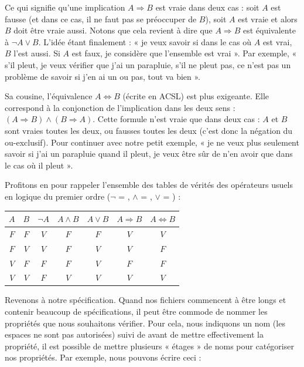 Ce qui signifie qu'une implication $A \Rightarrow B$ est vraie dans deux cas :
soit $A$ est fausse (et dans ce cas, il ne faut pas se préoccuper de $B$), soit
$A$ est vraie et alors $B$ doit être vraie aussi. Notons que cela revient à dire que
$A \Rightarrow B$ est équivalente à $\neg A \vee B$. L'idée étant finalement :
« je veux savoir si dans le cas où $A$ est vrai, $B$ l'est aussi. Si $A$ est
faux, je considère que l'ensemble est vrai ». Par exemple, « s'il pleut, je veux
vérifier que j'ai un parapluie, s'il ne pleut pas, ce n'est pas un problème
de savoir si j'en ai un ou pas, tout va bien ».



Sa cousine, l'équivalence $A \Leftrightarrow B$ (écrite  en ACSL)
est plus exigeante. Elle correspond à la conjonction de l'implication dans les deux sens :
$(A \Rightarrow B) \wedge (B \Rightarrow A)$. Cette formule n'est vraie que
dans deux cas : $A$ et $B$ sont vraies toutes les deux, ou fausses
toutes les deux (c'est donc la négation du ou-exclusif). Pour continuer avec
notre petit exemple, « je ne veux plus seulement savoir si j'ai un parapluie
quand il pleut, je veux être sûr de n'en avoir que dans le cas où il pleut ».



\begin{Information}
Profitons en pour rappeler l'ensemble des tables de vérités des opérateurs
usuels en logique du premier ordre ($\neg$ = \CodeInline{!}, $\wedge$ = \CodeInline{\&\&},
$\vee$ = \CodeInline{||}) :

\begin{longtabu}{|c|c|c|c|c|c|c|} \hline
$A$ & $B$ & $\neg A$ & $A \wedge B$ & $A \vee B$ & $A \Rightarrow B$ & $A \Leftrightarrow B$ \\ \hline
$F$ & $F$ & $V$ & $F$ & $F$ & $V$ & $V$ \\ \hline
$F$ & $V$ & $V$ & $F$ & $V$ & $V$ & $F$ \\ \hline
$V$ & $F$ & $F$ & $F$ & $V$ & $F$ & $F$ \\ \hline
$V$ & $V$ & $F$ & $V$ & $V$ & $V$ & $V$ \\ \hline
\end{longtabu}
\end{Information}


Revenons à notre spécification. Quand nos fichiers commencent à être longs et
contenir beaucoup de spécifications, il peut être commode de nommer les
propriétés que nous souhaitons vérifier. Pour cela, nous indiquons un nom (les
espaces ne sont pas autorisées) suivi de \CodeInline{:} avant de mettre effectivement
la propriété, il est possible de mettre plusieurs « étages » de noms pour
catégoriser nos propriétés. Par exemple, nous pouvons écrire ceci :



